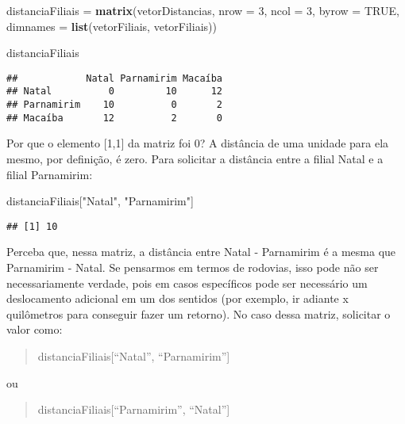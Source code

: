 \documentclass[
]{book}
\newenvironment{Shaded}{\begin{snugshade}}{\end{snugshade}}
\newcommand{\DataTypeTok}[1]{\textcolor[rgb]{0.13,0.29,0.53}{#1}}
\newcommand{\DecValTok}[1]{\textcolor[rgb]{0.00,0.00,0.81}{#1}}
\newcommand{\KeywordTok}[1]{\textcolor[rgb]{0.13,0.29,0.53}{\textbf{#1}}}
\newcommand{\NormalTok}[1]{#1}
\newcommand{\OtherTok}[1]{\textcolor[rgb]{0.56,0.35,0.01}{#1}}
\newcommand{\StringTok}[1]{\textcolor[rgb]{0.31,0.60,0.02}{#1}}
\begin{document}
\begin{Shaded}
\begin{Highlighting}[]
\NormalTok{distanciaFiliais =}\StringTok{ }\KeywordTok{matrix}\NormalTok{(vetorDistancias, }\DataTypeTok{nrow =} \DecValTok{3}\NormalTok{, }\DataTypeTok{ncol =} \DecValTok{3}\NormalTok{, }\DataTypeTok{byrow =} \OtherTok{TRUE}\NormalTok{,}
             \DataTypeTok{dimnames =} \KeywordTok{list}\NormalTok{(vetorFiliais, vetorFiliais))}

\NormalTok{distanciaFiliais}
\end{Highlighting}
\end{Shaded}

\begin{verbatim}
##            Natal Parnamirim Macaíba
## Natal          0         10      12
## Parnamirim    10          0       2
## Macaíba       12          2       0
\end{verbatim}

Por que o elemento {[}1,1{]} da matriz foi 0? A distância de uma unidade para ela mesmo, por definição, é zero. Para solicitar a distância entre a filial Natal e a filial Parnamirim:

\begin{Shaded}
\begin{Highlighting}[]
\NormalTok{distanciaFiliais[}\StringTok{"Natal"}\NormalTok{, }\StringTok{"Parnamirim"}\NormalTok{]}
\end{Highlighting}
\end{Shaded}

\begin{verbatim}
## [1] 10
\end{verbatim}

Perceba que, nessa matriz, a distância entre Natal - Parnamirim é a mesma que Parnamirim - Natal. Se pensarmos em termos de rodovias, isso pode não ser necessariamente verdade, pois em casos específicos pode ser necessário um deslocamento adicional em um dos sentidos (por exemplo, ir adiante x quilômetros para conseguir fazer um retorno). No caso dessa matriz, solicitar o valor como:

\begin{quote}
distanciaFiliais{[}``Natal'', ``Parnamirim''{]}
\end{quote}

ou

\begin{quote}
distanciaFiliais{[}``Parnamirim'', ``Natal''{]}
\end{quote}
\end{document}
